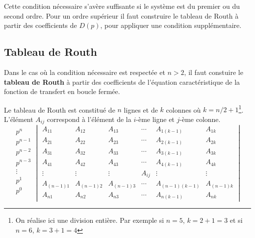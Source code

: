 Cette condition nécessaire s'avère suffisante si le système est du premier ou du second ordre.
Pour un ordre supérieur il faut construire le tableau de Routh à partir des coefficients de $D(p)$,
pour appliquer une condition supplémentaire. 

\subsection{Tableau de Routh}
Dans le cas où la condition nécessaire est respectée et $n>2$, il faut constuire le \textbf{tableau de Routh}
à partir des coefficients de l'équation caractéristique de la fonction de transfert en boucle fermée.

Le tableau de Routh est constitué de $n$ lignes et de $k$ colonnes 
où $k=n/2+1$\footnote{On réalise ici une division entière. Par exemple 
si $n=5$, $k=2+1=3$ et si $n=6$, $k=3+1=4$}. L'élément $A_{ij}$ correspond 
à l'élément de la $i$-ème ligne et $j$-ème colonne.
\[
\begin{matrix}
    p^n    \\
    p^{n-1}\\
    p^{n-2}\\
    p^{n-3}\\
    \vdots \\
    p^1    \\
    p^0    \\
\end{matrix}
\begin{vmatrix}
    A_{11}     & A_{12}     & A_{13}     & \cdots & A_{1(k-1)}     & A_{1k}      \\
    A_{21}     & A_{22}     & A_{23}     & \cdots & A_{2(k-1)}     & A_{2k}      \\
    A_{31}     & A_{32}     & A_{33}     & \cdots & A_{3(k-1)}     & A_{3k}      \\
    A_{41}     & A_{42}     & A_{43}     & \cdots & A_{4(k-1)}     & A_{4k}      \\
    \vdots     & \vdots     & \vdots     & A_{ij} & \vdots         & \vdots      \\
    A_{(n-1)1} & A_{(n-1)2} & A_{(n-1)3} & \cdots & A_{(n-1)(k-1)} & A_{(n-1)k}  \\
    A_{n1}     & A_{n2}     & A_{n3}     & \cdots & A_{n(k-1)}     & A_{nk}
\end{vmatrix}
\]

